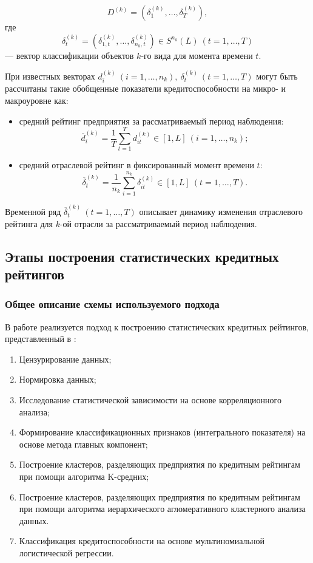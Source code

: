 \documentclass[14pt,a4paper]{extarticle}
\begin{document}
\[
D^{(k)} = \left( \delta_{1}^{(k)},\ldots,\delta_{T}^{(k)} \right),
\]
где
\[
\delta_{t}^{(k)} = \left( \delta_{1,t}^{(k)},\ldots,\delta_{n_{k},t}^{(k)} \right) \in S^{n_{k}}(L)\ (t=1,\ldots,T)
\]
--- вектор классификации объектов $k$-го вида для момента времени $t$.

При известных векторах $d_{i}^{(k)}\ (i=1,\ldots,n_{k}),\ \delta_{t}^{(k)}\ (t=1,\ldots,T)$ могут быть рассчитаны такие обобщенные показатели кредитоспособности на микро- и макроуровне как:
\begin{itemize}
    \item средний рейтинг предприятия за рассматриваемый период наблюдения:
    \[
    \overline{d}_{i}^{(k)} = \frac{1}{T}\sum_{t=1}^{T} d_{it}^{(k)} \in [1,L]\ (i=1,\ldots,n_{k});
    \]
    \item средний отраслевой рейтинг в фиксированный момент времени $t$:
    \[
    \overline{\delta}_{t}^{(k)} = \frac{1}{n_{k}}\sum_{i=1}^{n_{k}} \delta_{it}^{(k)} \in [1,L]\ (t=1,\ldots,T).
    \]
\end{itemize}
Временной ряд $\overline{\delta}_{t}^{(k)}\ (t=1,\ldots,T)$ описывает динамику изменения отраслевого рейтинга для $k$-ой отрасли за рассматриваемый период наблюдения.

\subsection{Этапы построения статистических кредитных рейтингов}

\subsubsection{Общее описание схемы используемого подхода}

В работе реализуется подход к построению статистических кредитных рейтингов, представленный в \cite{malugin2013}:
\begin{enumerate}
    \item Цензурирование данных;
    \item Нормировка данных;
    \item Исследование статистической зависимости на основе 
    корреляционного анализа;
    \item Формирование классификационных признаков (интегрального 
    показателя) на основе метода главных компонент;
    \item Построение кластеров, разделяющих предприятия по кредитным 
    рейтингам при помощи алгоритма K-средних;
    \item Построение кластеров, разделяющих предприятия по кредитным 
    рейтингам при помощи алгоритма иерархического агломеративного 
    кластерного анализа данных.
    \item Классификация кредитоспособности на основе мультиномиальной 
    логистической регрессии.
\end{enumerate}
\end{document}
